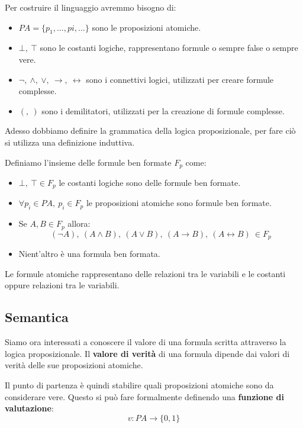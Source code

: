 Per costruire il linguaggio avremmo bisogno di:
\begin{itemize}
    \item $PA = \{p_1, \dots, pi, \dots\}$ sono le proposizioni atomiche.
    \item $\bot, \ \top$ sono le costanti logiche, rappresentano formule o sempre
          false o sempre vere.
    \item $\lnot, \ \land, \ \lor, \ \to, \ \leftrightarrow$ sono i connettivi
          logici, utilizzati per creare formule complesse.
    \item $(, \ )$ sono i demilitatori, utilizzati per la creazione di formule
          complesse.
\end{itemize}
Adesso dobbiamo definire la grammatica della logica proposizionale, per fare ciò
si utilizza una definizione induttiva.
\begin{definizione}
    Definiamo l'insieme delle formule ben formate $F_p$ come:
    \begin{itemize}
        \item $\bot, \ \top \in F_p$ le costanti logiche sono delle formule ben
              formate.
        \item $\forall p_i \in PA, \ p_i \in F_p$ le proposizioni atomiche sono
              formule ben formate.
        \item Se $A, B \in F_p$ allora:
              \begin{equation}
                  (\lnot A), \ (A \land B), \ (A \lor B), \ (A \to B), \ (A \leftrightarrow B) \ \in F_p
              \end{equation}
        \item Nient'altro è una formula ben formata.
    \end{itemize}
\end{definizione}
Le formule atomiche rappresentano delle relazioni tra le variabili e le costanti
oppure relazioni tra le variabili.
\subsection{Semantica}
Siamo ora interessati a conoscere il valore di una formula scritta attraverso la
logica proposizionale. Il \textbf{valore di verità} di una formula dipende dai
valori di verità delle sue proposizioni atomiche.

Il punto di partenza è quindi stabilire quali proposizioni atomiche sono da
considerare vere. Questo si può fare formalmente definendo una \textbf{funzione di valutazione}:
\begin{equation}
    v: PA \to \{0, 1\}
\end{equation}

